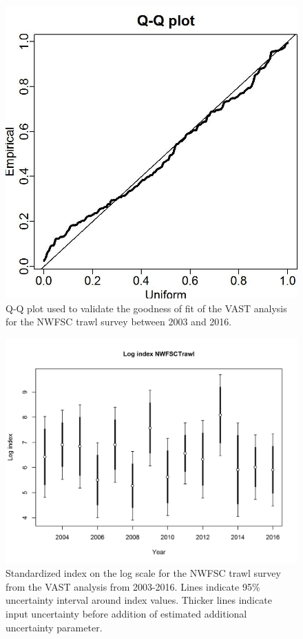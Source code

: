\documentclass[12pt,]{article}
\begin{document}
\begin{figure}[htbp]
\centering
\includegraphics{Figures/NWFSCtrawl_QQ.jpg}
\caption{Q-Q plot used to validate the goodness of fit of the VAST
analysis for the NWFSC trawl survey between 2003 and 2016.
\label{fig:Fleet8_NWFSCtrawl_QQ}}
\end{figure}

\begin{figure}[htbp]
\centering
\includegraphics{r4ss/plots_mod1/index4_logcpuedata_NWFSCtrawl.png}
\caption{Standardized index on the log scale for the NWFSC trawl survey
from the VAST analysis from 2003-2016. Lines indicate 95\% uncertainty
interval around index values. Thicker lines indicate input uncertainty
before addition of estimated additional uncertainty parameter.
\label{fig:index4_logcpuedata_NWFSCtrawl}}
\end{figure}
\end{document}
